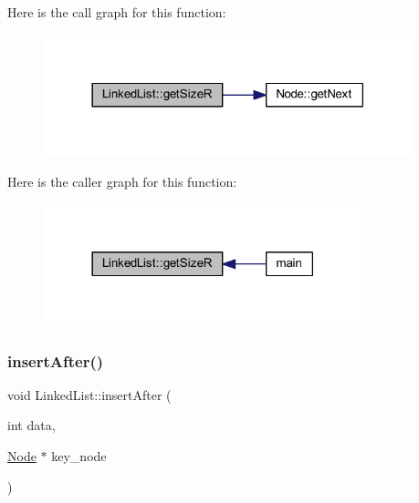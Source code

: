 Here is the call graph for this function\+:
\nopagebreak
\begin{figure}[H]
\begin{center}
\leavevmode
\includegraphics[width=302pt]{class_linked_list_af4b27646ebfb44d2fd0625b8ad1fb136_cgraph}
\end{center}
\end{figure}
Here is the caller graph for this function\+:
\nopagebreak
\begin{figure}[H]
\begin{center}
\leavevmode
\includegraphics[width=261pt]{class_linked_list_af4b27646ebfb44d2fd0625b8ad1fb136_icgraph}
\end{center}
\end{figure}
\mbox{\label{class_linked_list_af508f8b52bbcf1485a1552ac8fc84b81}} 
\subsubsection{\texorpdfstring{insert\+After()}{insertAfter()}}
{\footnotesize\ttfamily void Linked\+List\+::insert\+After (\begin{DoxyParamCaption}\item[{int}]{data,  }\item[{\hyperlink{class_node}{Node} $\ast$}]{key\+\_\+node }\end{DoxyParamCaption})}

